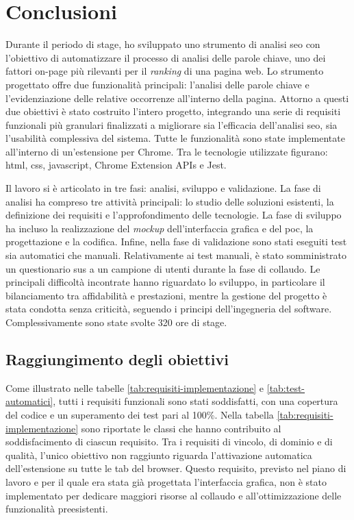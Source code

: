\chapter{Conclusioni}
\label{cap:conclusioni}

Durante il periodo di stage, ho sviluppato uno strumento di analisi \gls{seo} con l’obiettivo di automatizzare il processo di analisi delle parole chiave, uno dei fattori \gls{on-page} più rilevanti per il \textit{ranking} di una pagina web. Lo strumento progettato offre due funzionalità principali: l’analisi delle parole chiave e l’evidenziazione delle relative occorrenze all’interno della pagina. Attorno a questi due obiettivi è stato costruito l’intero progetto, integrando una serie di requisiti funzionali più granulari finalizzati a migliorare sia l’efficacia dell’analisi \gls{seo}, sia l’usabilità complessiva del sistema. Tutte le funzionalità sono state implementate all’interno di un’estensione per Chrome. Tra le tecnologie utilizzate figurano: \gls{html}, \gls{css}, \gls{javascript}, Chrome Extension APIs e Jest.

\vspace{10pt}
\noindent Il lavoro si è articolato in tre fasi: analisi, sviluppo e validazione. La fase di analisi ha compreso tre attività principali: lo studio delle soluzioni esistenti, la definizione dei \gls{requisiti} e l’approfondimento delle tecnologie. La fase di sviluppo ha incluso la realizzazione del \textit{mockup} dell'interfaccia grafica e del \gls{poc}, la progettazione e la codifica. Infine, nella fase di validazione sono stati eseguiti test sia automatici che manuali. Relativamente ai test manuali, è stato somministrato un questionario \gls{sus} a un campione di utenti durante la fase di collaudo. Le principali difficoltà incontrate hanno riguardato lo sviluppo, in particolare il bilanciamento tra affidabilità e prestazioni, mentre la gestione del progetto è stata condotta senza criticità, seguendo i principi dell’ingegneria del software. Complessivamente sono state svolte 320 ore di stage.

\section{Raggiungimento degli obiettivi}

Come illustrato nelle tabelle \ref{tab:requisiti-implementazione} e \ref{tab:test-automatici}, tutti i \gls{requisiti} funzionali sono stati soddisfatti, con una copertura del codice e un superamento dei test pari al 100\%. Nella tabella \ref{tab:requisiti-implementazione} sono riportate le classi che hanno contribuito al soddisfacimento di ciascun requisito. Tra i \gls{requisiti} di vincolo, di dominio e di qualità, l’unico obiettivo non raggiunto riguarda l’attivazione automatica dell’estensione su tutte le tab del browser. Questo requisito, previsto nel piano di lavoro e per il quale era stata già progettata l’interfaccia grafica, non è stato implementato per dedicare maggiori risorse al collaudo e all’ottimizzazione delle funzionalità preesistenti.

